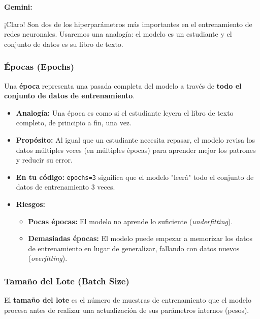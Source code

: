 \documentclass[12pt, a4paper]{article}
\newenvironment{gemini}{\par\noindent\textbf{Gemini:}\par\ignorespaces}{\par}
\begin{document}
\begin{gemini}
¡Claro! Son dos de los hiperparámetros más importantes en el entrenamiento de redes neuronales. Usaremos una analogía: el modelo es un estudiante y el conjunto de datos es su libro de texto.

\subsubsection{Épocas (Epochs)}
Una \textbf{época} representa una pasada completa del modelo a través de \textbf{todo el conjunto de datos de entrenamiento}.

\begin{itemize}
    \item \textbf{Analogía:} Una época es como si el estudiante leyera el libro de texto completo, de principio a fin, una vez.
    \item \textbf{Propósito:} Al igual que un estudiante necesita repasar, el modelo revisa los datos múltiples veces (en múltiples épocas) para aprender mejor los patrones y reducir su error.
    \item \textbf{En tu código:} \texttt{epochs=3} significa que el modelo "leerá" todo el conjunto de datos de entrenamiento 3 veces.
    \item \textbf{Riesgos:}
        \begin{itemize}
            \item \textbf{Pocas épocas:} El modelo no aprende lo suficiente (\textit{underfitting}).
            \item \textbf{Demasiadas épocas:} El modelo puede empezar a memorizar los datos de entrenamiento en lugar de generalizar, fallando con datos nuevos (\textit{overfitting}).
        \end{itemize}
\end{itemize}

\subsubsection{Tamaño del Lote (Batch Size)}
El \textbf{tamaño del lote} es el número de muestras de entrenamiento que el modelo procesa antes de realizar una actualización de sus parámetros internos (pesos).


\end{gemini}
\end{document}
